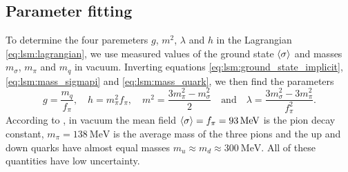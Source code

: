 \subsection{Parameter fitting}
\label{sec:lsm:parameter_fit}

To determine the four paremeters $g$, $m^2$, $\lambda$ and $h$ in the Lagrangian \eqref{eq:lsm:lagrangian},
we use measured values of the ground state $\langle \sigma \rangle$ and masses $m_\sigma$, $m_\pi$ and $m_q$ in vacuum.
Inverting equations \eqref{eq:lsm:ground_state_implicit}, \eqref{eq:lsm:mass_sigmapi} and \eqref{eq:lsm:mass_quark}, we then find the parameters
\begin{equation}
	g       = \frac{m_q}{f_\pi}, \quad %
	h       = m_\pi^2 f_\pi, \quad %
	m^2     = \frac{3m_\pi^2 - m_\sigma^2}{2} \quad \text{and} \quad %
	\lambda = \frac{3 m_\sigma^2 - 3 m_\pi^2}{f_\pi^2} .    %
\label{eq:lsm:parameters}
\end{equation}
According to \cite{ref:pdg_review_2021}, in vacuum the mean field $\langle \sigma \rangle = f_\pi = \SI{93}{\mega\electronvolt}$ is the pion decay constant,
$m_\pi = \SI{138}{\mega\electronvolt}$ is the average mass of the three pions
and the up and down quarks have almost equal masses $m_u \approx m_d \approx \SI{300}{\mega\electronvolt}$.
All of these quantities have low uncertainty.

